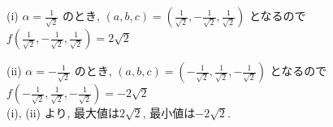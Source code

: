 \documentclass{jsarticle}
\begin{document}
\bigskip

(i) $\alpha = \displaystyle \frac{1}{\sqrt{2}}$ のとき, $(a,b,c) = \left(\displaystyle \frac{1}{\sqrt{2}}, -\displaystyle \frac{1}{\sqrt{2}}, \displaystyle \frac{1}{\sqrt{2}} \right)$ となるので $f \left(\displaystyle \frac{1}{\sqrt{2}}, -\displaystyle \frac{1}{\sqrt{2}}, \displaystyle \frac{1}{\sqrt{2}}\right) = 2\sqrt{2}$

(ii) $\alpha = -\displaystyle \frac{1}{\sqrt{2}}$ のとき, $(a,b,c) = \left(-\displaystyle \frac{1}{\sqrt{2}}, \displaystyle \frac{1}{\sqrt{2}}, -\displaystyle \frac{1}{\sqrt{2}} \right)$ となるので $f \left(-\displaystyle \frac{1}{\sqrt{2}}, \displaystyle \frac{1}{\sqrt{2}}, -\displaystyle \frac{1}{\sqrt{2}} \right) = -2\sqrt{2}$ \\
\bigskip
(i), (ii) より, 最大値は$2\sqrt{2}$, 最小値は$-2\sqrt{2}$.
\end{document}
